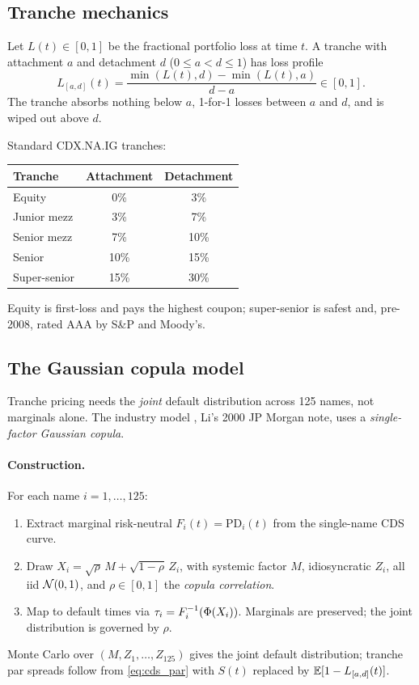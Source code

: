 \subsection{Tranche mechanics}

Let $L(t) \in [0,1]$ be the fractional portfolio loss at time $t$.
A tranche with attachment $a$ and detachment $d$ ($0 \le a < d \le
1$) has loss profile
\[
  L_{[a,d]}(t)
  = \frac{\min(L(t), d) - \min(L(t), a)}{d - a} \in [0, 1].
\]
The tranche absorbs nothing below $a$, 1-for-1 losses between $a$
and $d$, and is wiped out above $d$.

Standard CDX.NA.IG tranches:
\begin{center}
\begin{tabular}{@{}lcc@{}}
\toprule
\textbf{Tranche} & \textbf{Attachment} & \textbf{Detachment} \\
\midrule
Equity          & 0\%  & 3\%   \\
Junior mezz     & 3\%  & 7\%   \\
Senior mezz     & 7\%  & 10\%  \\
Senior          & 10\% & 15\%  \\
Super-senior    & 15\% & 30\%  \\
\bottomrule
\end{tabular}
\end{center}
Equity is first-loss and pays the highest coupon; super-senior is
safest and, pre-2008, rated AAA by S\&P and Moody's.

\subsection{The Gaussian copula model}

Tranche pricing needs the \emph{joint} default distribution across
125 names, not marginals alone.  The industry model
\citep{li2000default}, Li's 2000 JP Morgan note, uses a
\emph{single-factor Gaussian copula}.

\paragraph{Construction.}  For each name $i = 1, \ldots, 125$:
\begin{enumerate}
  \item Extract marginal risk-neutral $F_i(t) = \mathrm{PD}_i(t)$
    from the single-name CDS curve.
  \item Draw $X_i = \sqrt{\rho}\, M + \sqrt{1 - \rho}\, Z_i$, with
    systemic factor $M$, idiosyncratic $Z_i$, all iid
    $\mathcal{N}(0,1)$, and $\rho \in [0,1]$ the \emph{copula
    correlation}.
  \item Map to default times via $\tau_i = F_i^{-1}(\Phi(X_i))$.
    Marginals are preserved; the joint distribution is governed by
    $\rho$.
\end{enumerate}
Monte Carlo over $(M, Z_1, \ldots, Z_{125})$ gives the joint
default distribution; tranche par spreads follow from
\cref{eq:cds_par} with $S(t)$ replaced by $\mathbb{E}[1 - L_{[a,d]}(t)]$.


